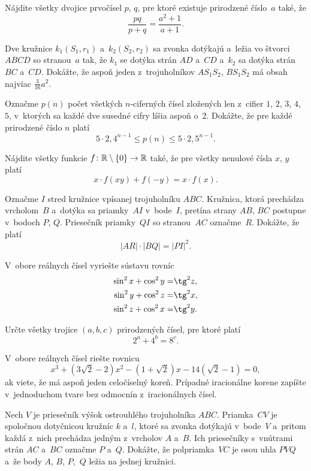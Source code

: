 ﻿{%
Nájdite všetky dvojice prvočísel $p$, $q$, pre ktoré existuje prirodzené
číslo~$a$ také, že
$$
\frac{pq}{p+q}=\frac{a^2+1}{a+1}.
$$}

{%
Dve kružnice $k_1(S_1,r_1)$ a~$k_2(S_2,r_2)$ sa zvonka dotýkajú
a~ležia vo štvorci $ABCD$ so stranou~$a$
tak, že $k_1$ se dotýka strán $AD$ a~$CD$ a~$k_2$ sa dotýka strán $BC$
a~$CD$. Dokážte, že aspoň jeden z~trojuholníkov
$AS_1S_2$, $ BS_1S_2$ má obsah najviac $\frac3{16}a^2$.}

{%
Označme $p(n)$
počet všetkých $n$-ciferných čísel zložených len z~cifier
$1$, $2$, $3$, $4$, $5$, v~ktorých
sa každé dve susedné cifry líšia aspoň o~$2$.
Dokážte, že pre každé prirodzené číslo $n$ platí
$$
5\cdot2{,}4^{n-1}\le p(n)\le 5\cdot2{,}5^{n-1}.
$$}

{%
Nájdite všetky funkcie $f\colon {\Bbb R}\setminus\{0\}\to {\Bbb R}$ také, že pre všetky
nenulové čísla $x$, $y$ platí
$$
x\cdot f(xy)+f(-y)=x\cdot f(x).
$$}

{%
Označme $I$ stred kružnice vpísanej trojuholníku $ABC$. Kružnica, ktorá
prechádza vrcholom~$B$
a~dotýka sa priamky~$AI$ v~bode~$I$, pretína strany $AB$, $BC$ postupne
v~bodoch $P$, $Q$. Priesečník priamky~$QI$ so stranou~$AC$ označme~$R$.
Dokážte, že platí
$$
|AR|\cdot|BQ|=|PI|^2.
$$}

{%
V~obore reálnych čísel vyriešte sústavu rovníc
$$
\aligned
\sin^2x+\cos^2y=&\tg^2z,\\
\sin^2y+\cos^2z=&\tg^2x,\\
\sin^2z+\cos^2x=&\tg^2y.
\endaligned
$$}

{%
Určte všetky trojice $(a,b,c)$ prirodzených čísel, pre ktoré platí
$$
2^a+4^b=8^c.
$$}

{%
V~obore reálnych čísel riešte rovnicu
$$
x^3+(3\sqrt2-2)x^2-(1+\sqrt2)x-14(\sqrt2-1)=0,
$$
ak viete, že má aspoň jeden celočíselný koreň. Prípadné iracionálne korene
zapíšte v~jednoduchom tvare bez odmocnín z~iracionálnych čísel.}

{%
Nech $V$ je priesečník výšok ostrouhlého trojuholníka $ABC$. Priamka~$CV$ je
spoločnou dotyčnicou kružníc $k$ a~$l$, ktoré sa zvonka dotýkajú v~bode~$V$
a~pritom každá z~nich prechádza jedným z~vrcholov $A$ a~$B$. Ich priesečníky
s~vnútrami strán $AC$ a~$BC$ označme $P$ a~$Q$.
Dokážte, že polpriamka~$VC$ je osou uhla $PVQ$ a~že body $A$, $B$, $P$,~$Q$ ležia na jednej kružnici.}

